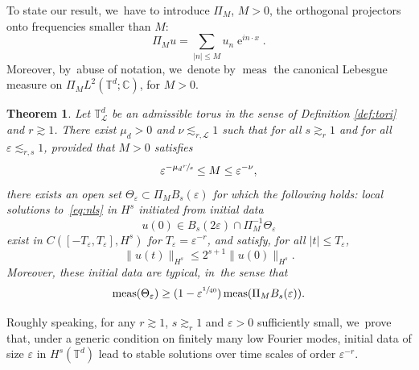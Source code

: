 \documentclass[JEP,XML,SOM,Unicode,published]{cedram}
\theoremstyle{plain}
\newtheorem{theorem}{Theorem}[section]
\theoremstyle{definition}
\DeclareMathOperator{\e}{e}
\DeclareMathOperator{\meas}{meas}
\newcommand{\T}{\mathbb{T}}
\newcommand{\1}{\mathbf{1}}
\let\epsilon\varepsilon
\begin{document}
To state our result, we~have to introduce $\Pi_{M}$, $M>0$, the orthogonal projectors onto frequencies smaller than $M$:
\[
\Pi_{M}u = \sum_{|n|\leq M}u_{n}\e^{in\cdot x}.
\]
Moreover, by~abuse of notation, we~denote by $\meas$ the canonical Lebesgue measure on $\Pi_M L^2(\mathbb{T}^d; \mathbb{C})$, for $M>0$.

\begin{theorem}\label{thm:main} Let $\mathbb T_{\mathscr{L}}^{d}$ be an admissible torus in the sense of Definition \ref{def:tori} and $r\gtrsim1$. There exist $\mu_d>0$ and $\nu\lesssim_{r,\mathscr{L}} 1$ such that for all $s\gtrsim_{r}1$ and for all $\varepsilon \lesssim_{r,s} 1$, provided that $M>0$ satisfies
\begin{equation}
\label{eq:contrainte_pour_M}
\varepsilon^{- \mu_d \sfrac{r}s} \leq M \leq \varepsilon^{-\nu},
\end{equation}
there exists an open set $\Theta_{\varepsilon}\subset\Pi_{M}B_{s}(\varepsilon)$
for which the following holds: local solutions to~\eqref{eq:nls} in $H^{s}$ initiated from initial data
\begin{equation}
\label{eq:haut_mode_sympas}
u(0)\in B_{s}(2\varepsilon)\cap\Pi_{M}^{-1}\Theta_{\varepsilon}
\end{equation}
exist in $C([-T_\varepsilon,T_\varepsilon],H^{s})$ for $T_\varepsilon =\varepsilon^{-r}$, and satisfy, for all $|t|\leq T_{\epsilon}$,
\begin{equation}
\label{eq:thm-dyn}
\|u(t)\|_{H^{s}}\leq 2^{s+1} \| u(0) \|_{H^s}.
\end{equation}
Moreover, these initial data are typical, in~the sense that
\begin{equation}
\label{eq:thm-meas}
\meas(\Theta_{\varepsilon})\geq (1-\varepsilon^{\sfrac{1}{40}})\meas(\Pi_{M}B_{s}(\varepsilon)).
\end{equation}
\end{theorem}

Roughly speaking, for any $r\gtrsim1$, $s\gtrsim_{r}1$ and $\epsilon>0$ sufficiently small, we~prove that, under a generic condition on finitely many low Fourier modes, initial data of size $\epsilon$ in $H^{s}(\T^{d})$ lead to stable solutions over time scales of order $\epsilon^{-r}$.
\end{document}
